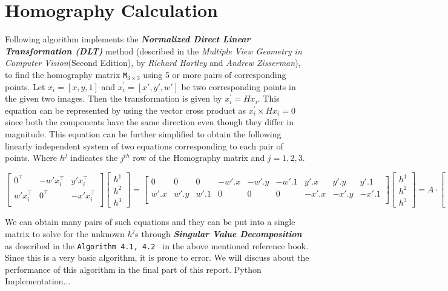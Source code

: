 \section{Homography Calculation}


Following algorithm implements the \textbf{\textit{Normalized Direct Linear Transformation (DLT)}} method (described in the \textit{Multiple View Geometry in Computer Vision}(Second Edition), by \textit{Richard Hartley} and   \textit{Andrew Zisserman}), to find the homography matrix {\tt M}$_{3 \times 3}$ using 5 or more pairs of corresponding points. Let $x_i = [x , y, 1]$ and $x_i^\prime = [x\prime , y\prime, w\prime ] $  be two corresponding points in the given two images. Then the transformation is given by $x_i^\prime = Hx_i$. This equation can be represented by using the vector cross product as  $x_i^\prime \times Hx_i = 0$ since both the components have the same direction even though they differ in magnitude. This equation can be further simplified  to obtain the following linearly independent  system of two equations corresponding to each pair of points. Where $h^j$ indicates the $j^{th}$ row of the Homography matrix and $j = {1,2,3}$.

{\footnotesize
\begin{equation*}
	\begin{bmatrix}
		0^\top & -w\prime x_i^\top & y\prime x_i^\top\\
		w\prime x_i^\top	& 0^\top & -x\prime x_i^\top\\
	\end{bmatrix} 
	\begin{bmatrix}
		h^1\\
		h^2\\
		h^3
	\end{bmatrix} =
	\begin{bmatrix}
		0& 0 &0 & -w\prime.x&-w\prime.y&-w\prime.1& y\prime.x & y\prime.y& y\prime.1\\
		w\prime.x&w\prime.y&w\prime.1& 0& 0 &0 & -x\prime.x& -x\prime.y& -x\prime.1\\
	\end{bmatrix}
	\begin{bmatrix}
		h^1\\
		h^2\\
		h^3
	\end{bmatrix} =
	A\cdot	\begin{bmatrix}
		h^1\\
		h^2\\
		h^3
	\end{bmatrix} = O
\end{equation*}
}

We can obtain many pairs of such equations and they can be put into a single matrix to solve for the unknown  $h^j$s through \textbf{\textit{Singular Value Decomposition}} as described in the {\tt Algorithm 4.1, 4.2 } in the above mentioned reference book. Since this is a very basic algorithm, it is prone to error. We will discuss about the performance of this algorithm in the final part of this report.
{\color{cyan} Python Implementation...}
